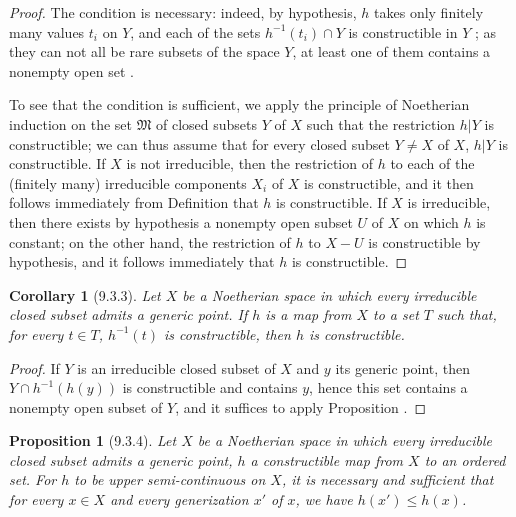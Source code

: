 \documentclass[oneside]{amsart}
\theoremstyle{ega-env-style}
\theoremstyle{ega-thm-env-style}
\newtheorem*{proposition}{Proposition}
\newtheorem*{corollary}{Corollary}
\theoremstyle{ega-defn-env-style}
\def\leq{\leqslant}                 %
\def\setmin{-}                      %
\newcommand{\oldpage}[2][]{{\marginnote{\normalfont{\textbf{#1}~|~#2}}}\ignorespaces}
\let\EGAOriginalLabel\label
\renewcommand{\label}[1]{\phantomsection\EGAOriginalLabel{#1}}
\begin{document}
\begin{proof}
The condition is necessary: indeed, by hypothesis, $h$ takes only finitely many values $t_i$ on $Y$, and each of the sets $h^{-1}(t_i)\cap Y$ is constructible in $Y$ ; as they can not all be rare subsets of the space $Y$, at least one of them contains a nonempty open set .

\oldpage[0\textsubscript{III}]{17}
To see that the condition is sufficient, we apply the principle of Noetherian induction on the set $\mathfrak{M}$ of closed subsets $Y$ of $X$ such that the restriction $h|Y$ is constructible; we can thus assume that for every closed subset $Y\neq X$ of $X$,
$h|Y$ is constructible.
If $X$ is not irreducible, then the restriction of $h$ to each of the (finitely many) irreducible components $X_i$ of $X$ is constructible, and it then follows immediately from Definition  that $h$ is constructible.
If $X$ is irreducible, then there exists by hypothesis a nonempty open subset $U$ of $X$ on which $h$ is constant; on the other hand, the restriction of $h$ to $X\setmin U$ is constructible by hypothesis, and it follows immediately that $h$ is constructible.
\end{proof}

\begin{corollary}[9.3.3]
\label{0.9.3.3}
Let $X$ be a Noetherian space in which every irreducible closed subset admits a generic point.
If $h$ is a map from $X$ to a set $T$ such that, for every $t\in T$, $h^{-1}(t)$ is constructible, then $h$ is constructible.
\end{corollary}

\begin{proof}
If $Y$ is an irreducible closed subset of $X$ and $y$ its generic point, then $Y\cap h^{-1}(h(y))$ is constructible and contains $y$, hence  this set contains a nonempty open subset of $Y$, and it suffices to apply Proposition .
\end{proof}

\begin{proposition}[9.3.4]
\label{0.9.3.4}
Let $X$ be a Noetherian space in which every irreducible closed subset admits a generic point, $h$ a constructible map from $X$ to an ordered set.
For $h$ to be upper semi-continuous on $X$, it is necessary and sufficient that for every $x\in X$ and every generization  $x'$ of $x$, we have $h(x')\leq h(x)$.
\end{proposition}
\end{document}

